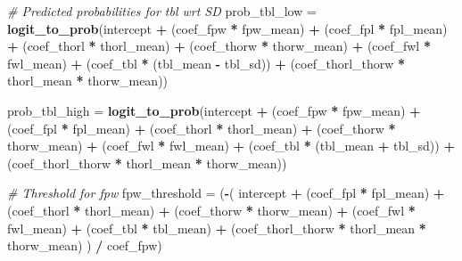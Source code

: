 \documentclass[
]{article}
\newenvironment{Shaded}{\begin{snugshade}}{\end{snugshade}}
\newcommand{\CommentTok}[1]{\textcolor[rgb]{0.56,0.35,0.01}{\textit{#1}}}
\newcommand{\FunctionTok}[1]{\textcolor[rgb]{0.13,0.29,0.53}{\textbf{#1}}}
\newcommand{\NormalTok}[1]{#1}
\newcommand{\OtherTok}[1]{\textcolor[rgb]{0.56,0.35,0.01}{#1}}
\newcommand{\SpecialCharTok}[1]{\textcolor[rgb]{0.81,0.36,0.00}{\textbf{#1}}}
\begin{document}
\begin{Shaded}
\begin{Highlighting}[]
\CommentTok{\# Predicted probabilities for tbl wrt SD}
\NormalTok{prob\_tbl\_low }\OtherTok{=} \FunctionTok{logit\_to\_prob}\NormalTok{(intercept }\SpecialCharTok{+} 
\NormalTok{                               (coef\_fpw }\SpecialCharTok{*}\NormalTok{ fpw\_mean) }\SpecialCharTok{+} 
\NormalTok{                               (coef\_fpl }\SpecialCharTok{*}\NormalTok{ fpl\_mean) }\SpecialCharTok{+} 
\NormalTok{                               (coef\_thorl }\SpecialCharTok{*}\NormalTok{ thorl\_mean) }\SpecialCharTok{+} 
\NormalTok{                               (coef\_thorw }\SpecialCharTok{*}\NormalTok{ thorw\_mean) }\SpecialCharTok{+} 
\NormalTok{                               (coef\_fwl }\SpecialCharTok{*}\NormalTok{ fwl\_mean) }\SpecialCharTok{+} 
\NormalTok{                               (coef\_tbl }\SpecialCharTok{*}\NormalTok{ (tbl\_mean }\SpecialCharTok{{-}}\NormalTok{ tbl\_sd)) }\SpecialCharTok{+} 
\NormalTok{                               (coef\_thorl\_thorw }\SpecialCharTok{*}\NormalTok{ thorl\_mean }\SpecialCharTok{*}\NormalTok{ thorw\_mean))}

\NormalTok{prob\_tbl\_high }\OtherTok{=} \FunctionTok{logit\_to\_prob}\NormalTok{(intercept }\SpecialCharTok{+} 
\NormalTok{                                (coef\_fpw }\SpecialCharTok{*}\NormalTok{ fpw\_mean) }\SpecialCharTok{+} 
\NormalTok{                                (coef\_fpl }\SpecialCharTok{*}\NormalTok{ fpl\_mean) }\SpecialCharTok{+} 
\NormalTok{                                (coef\_thorl }\SpecialCharTok{*}\NormalTok{ thorl\_mean) }\SpecialCharTok{+} 
\NormalTok{                                (coef\_thorw }\SpecialCharTok{*}\NormalTok{ thorw\_mean) }\SpecialCharTok{+} 
\NormalTok{                                (coef\_fwl }\SpecialCharTok{*}\NormalTok{ fwl\_mean) }\SpecialCharTok{+} 
\NormalTok{                                (coef\_tbl }\SpecialCharTok{*}\NormalTok{ (tbl\_mean }\SpecialCharTok{+}\NormalTok{ tbl\_sd)) }\SpecialCharTok{+} 
\NormalTok{                                (coef\_thorl\_thorw }\SpecialCharTok{*}\NormalTok{ thorl\_mean }\SpecialCharTok{*}\NormalTok{ thorw\_mean))}


\CommentTok{\# Threshold for fpw}
\NormalTok{fpw\_threshold }\OtherTok{=}\NormalTok{ (}\SpecialCharTok{{-}}\NormalTok{(}
\NormalTok{  intercept }\SpecialCharTok{+} 
\NormalTok{  (coef\_fpl }\SpecialCharTok{*}\NormalTok{ fpl\_mean) }\SpecialCharTok{+} 
\NormalTok{  (coef\_thorl }\SpecialCharTok{*}\NormalTok{ thorl\_mean) }\SpecialCharTok{+} 
\NormalTok{  (coef\_thorw }\SpecialCharTok{*}\NormalTok{ thorw\_mean) }\SpecialCharTok{+} 
\NormalTok{  (coef\_fwl }\SpecialCharTok{*}\NormalTok{ fwl\_mean) }\SpecialCharTok{+} 
\NormalTok{  (coef\_tbl }\SpecialCharTok{*}\NormalTok{ tbl\_mean) }\SpecialCharTok{+} 
\NormalTok{  (coef\_thorl\_thorw }\SpecialCharTok{*}\NormalTok{ thorl\_mean }\SpecialCharTok{*}\NormalTok{ thorw\_mean)}
\NormalTok{) }\SpecialCharTok{/}\NormalTok{ coef\_fpw)}


\end{Highlighting}
\end{Shaded}
\end{document}
